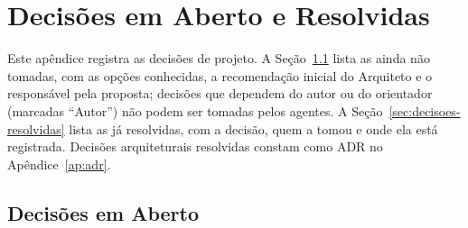 \chapter{Decisões em Aberto e Resolvidas}\label{ap:decisoes}

Este apêndice registra as decisões de projeto. A Seção~\ref{sec:decisoes-abertas} lista as ainda não tomadas, com as opções conhecidas, a recomendação inicial do Arquiteto e o responsável pela proposta; decisões que dependem do autor ou do orientador (marcadas ``Autor'') não podem ser tomadas pelos agentes. A Seção~\ref{sec:decisoes-resolvidas} lista as já resolvidas, com a decisão, quem a tomou e onde ela está registrada. Decisões arquiteturais resolvidas constam como ADR no Apêndice~\ref{ap:adr}.

\section{Decisões em Aberto}\label{sec:decisoes-abertas}

